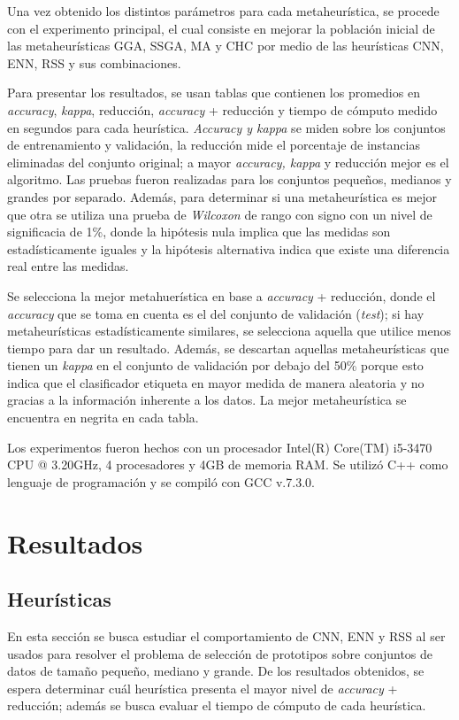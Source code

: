 Una vez obtenido los distintos parámetros para cada metaheurística, se procede con el experimento principal, el cual consiste en mejorar la población inicial de las metaheurísticas GGA, SSGA, MA y CHC por medio de las heurísticas CNN, ENN, RSS y sus combinaciones.

Para presentar los resultados, se usan tablas que contienen los promedios en \emph{accuracy}, \emph{kappa}, reducción, \emph{accuracy} + reducción y tiempo de cómputo medido en segundos para cada heurística. \emph{Accuracy y kappa} se miden sobre los conjuntos de entrenamiento y validación, la reducción mide el porcentaje de instancias eliminadas del conjunto original; a mayor \emph{accuracy, kappa} y reducción mejor es el algoritmo. Las pruebas fueron realizadas para los conjuntos pequeños, medianos y grandes por separado. Además, para determinar si una metaheurística es mejor que otra se utiliza una prueba de \emph{Wilcoxon} de rango con signo con un nivel de significacia de 1\%, donde la hipótesis nula implica que las medidas son estadísticamente iguales y la hipótesis alternativa indica que existe una diferencia real entre las medidas. 


Se selecciona la mejor metahuerística en base a \emph{accuracy} + reducción, donde el \emph{accuracy} que se toma en cuenta es el del conjunto de validación (\emph{test}); si hay metaheurísticas estadísticamente similares, se selecciona aquella que utilice menos tiempo para dar un resultado. Además, se descartan aquellas metaheurísticas que tienen un \emph{kappa} en el conjunto de validación por debajo del 50\% porque esto indica que el clasificador etiqueta en mayor medida de manera aleatoria y no gracias a la información inherente a los datos. La mejor metaheurística se encuentra en negrita en cada tabla.

Los experimentos fueron hechos con un procesador Intel(R) Core(TM) i5-3470 CPU @ 3.20GHz, 4 procesadores y 4GB de memoria RAM. Se utilizó C++ como lenguaje de programación y se compiló con GCC v.7.3.0.

\section{Resultados}

\subsection{Heurísticas}

En esta sección se busca estudiar el comportamiento de CNN, ENN y RSS al ser usados para resolver el problema de selección de prototipos sobre conjuntos de datos de tamaño pequeño, mediano y grande. De los resultados obtenidos, se espera determinar cuál heurística presenta el mayor nivel de \emph{accuracy} + reducción; además se busca evaluar el tiempo de cómputo de cada heurística.


